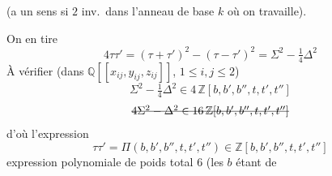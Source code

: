 \documentclass[11pt,a4paper]{article}
\begin{document}
(a un sens si $2$ inv.\ dans l'anneau de base $k$ où on travaille).

On en tire
\[
  4\tau\tau' = (\tau+\tau')^2 - (\tau-\tau')^2 = \Sigma^2 - \tfrac14 \Delta^2
\]
À vérifier (dans $\mathbb{Q}[[x_{ij}, y_{ij}, z_{ij}]]$, $1 \leq i,j \leq 2$)
\[
  \Sigma^2 - \tfrac14 \Delta^2 \in 4\, \mathbb{Z}[b,b',b'',t,t',t'']
\]
\[
  \text{\struck{$4\Sigma^2 - \Delta^2 \in 16\, \mathbb{Z}[b,b',b'',t,t',t'']$}}
\]
d'où l'expression
\[
  \tau\tau' = \Pi(b,b',b'',t,t',t'') \in \mathbb{Z}[b,b',b'',t,t',t'']
\]
expression polynomiale de poids total $6$ (les $b$ étant de
\end{document}
